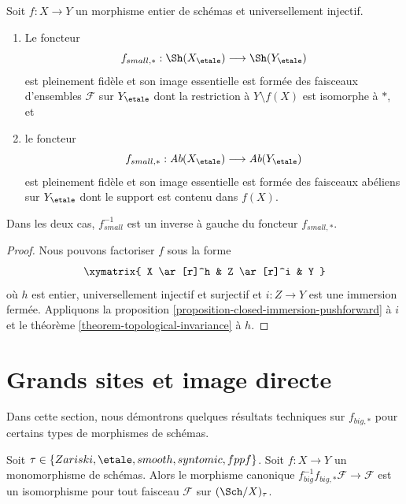 \begin{proposition}
\label{proposition-integral-universally-injective-pushforward}
Soit $f : X \to Y$ un morphisme entier de sch\'emas
et universellement injectif.
\begin{enumerate}
\item Le foncteur
$$
f_{small, *} :
\Sh(X_\etale)
\longrightarrow
\Sh(Y_\etale)
$$
est pleinement fid\`ele et son image essentielle est form\'ee des faisceaux d'ensembles
$\mathcal{F}$ sur $Y_\etale$ dont la restriction \`a $Y \setminus f(X)$ est
isomorphe \`a $*$, et
\item le foncteur
$$
f_{small, *} :
\textit{Ab}(X_\etale)
\longrightarrow
\textit{Ab}(Y_\etale)
$$
est pleinement fid\`ele et son image essentielle est form\'ee des faisceaux ab\'eliens sur
$Y_\etale$ dont le support est contenu dans $f(X)$.
\end{enumerate}
Dans les deux cas, $f_{small}^{-1}$ est un inverse \`a gauche du foncteur
$f_{small, *}$.
\end{proposition}

\begin{proof}
Nous pouvons factoriser $f$ sous la forme
$$
\xymatrix{
X \ar[r]^h & Z \ar[r]^i & Y
}
$$
o\`u $h$ est entier, universellement injectif et surjectif
et $i : Z \to Y$ est une immersion ferm\'ee.
Appliquons la
proposition \ref{proposition-closed-immersion-pushforward}
\`a $i$ et le
th\'eor\`eme \ref{theorem-topological-invariance}
\`a $h$.
\end{proof}









\section{Grands sites et image directe}
\label{section-big}

\noindent
Dans cette section, nous d\'emontrons quelques r\'esultats techniques sur $f_{big, *}$ pour
certains types de morphismes de sch\'emas.

\begin{lemma}
\label{lemma-monomorphism-big-push-pull}
Soit $\tau \in \{Zariski, \etale, smooth, syntomic, fppf\}$.
Soit $f : X \to Y$ un monomorphisme de sch\'emas.
Alors le morphisme canonique
$f_{big}^{-1}f_{big, *}\mathcal{F} \to \mathcal{F}$
est un isomorphisme pour tout faisceau $\mathcal{F}$ sur
$(\Sch/X)_\tau$.
\end{lemma}

